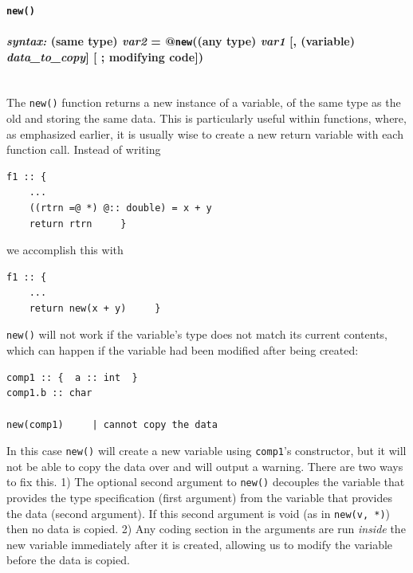 \documentclass{article}
\newenvironment{code}{
       \begin{list}{}{
               \setlength{\leftmargin}{.4in}
               \setlength{\rightmargin}{0in}
               \setlength{\topsep}{.2in}
       }
       \small
       \item[] }
       { \end{list}   }
\begin{document}
\paragraph{\texttt{new()}\\\\
\normalfont \emph{syntax: } (same type) \emph{var2} = @\texttt{new}((any type) \emph{var1} [, (variable) \emph{data\_to\_copy}] [ ; modifying code])\\\\}

The \texttt{new()} function returns a new instance of a variable, of the same type as the old and storing the same data.  This is particularly useful within functions, where, as emphasized earlier, it is usually wise to create a new return variable with each function call.  Instead of writing

\begin{code} \begin{verbatim}
f1 :: {
    ...
    ((rtrn =@ *) @:: double) = x + y
    return rtrn     }
\end{verbatim} \end{code}

\noindent we accomplish this with

\begin{code} \begin{verbatim}
f1 :: {
    ...
    return new(x + y)     }
\end{verbatim} \end{code}

\texttt{new()} will not work if the variable's type does not match its current contents, which can happen if the variable had been modified after being created:

\begin{code} \begin{verbatim}
comp1 :: {  a :: int  }
comp1.b :: char

new(comp1)     | cannot copy the data
\end{verbatim} \end{code}

\noindent In this case \texttt{new()} will create a new variable using \texttt{comp1}'s constructor, but it will not be able to copy the data over and will output a warning.  There are two ways to fix this.  1) The optional second argument to \verb#new()# decouples the variable that provides the type specification (first argument) from the variable that provides the data (second argument).  If this second argument is void (as in \verb#new(v, *)#) then no data is copied.  2) Any coding section in the arguments are run \emph{inside} the new variable immediately after it is created, allowing us to modify the variable before the data is copied.
\end{document}
